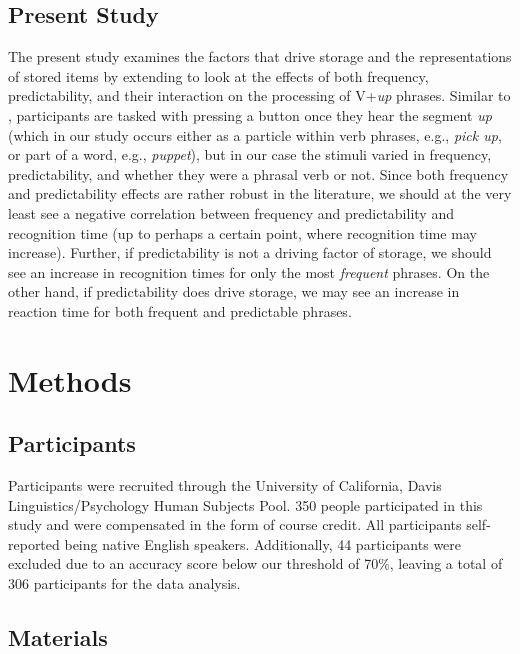\documentclass[
  authoryear,
  preprint,
  1p,
  onecolumn]{elsarticle}
\begin{document}
\subsection{Present Study}\label{present-study}

The present study examines the factors that drive storage and the
representations of stored items by extending \citet{kapatsinski2009} to
look at the effects of both frequency, predictability, and their
interaction on the processing of V+\emph{up} phrases. Similar to
\citet{kapatsinski2009}, participants are tasked with pressing a button
once they hear the segment \emph{up} (which in our study occurs either
as a particle within verb phrases, e.g., \emph{pick up}, or part of a
word, e.g., \emph{puppet}), but in our case the stimuli varied in
frequency, predictability, and whether they were a phrasal verb or not.
Since both frequency and predictability effects are rather robust in the
literature, we should at the very least see a negative correlation
between frequency and predictability and recognition time (up to perhaps
a certain point, where recognition time may increase). Further, if
predictability is not a driving factor of storage, we should see an
increase in recognition times for only the most \emph{frequent} phrases.
On the other hand, if predictability does drive storage, we may see an
increase in reaction time for both frequent and predictable phrases.

\section{Methods}\label{methods}

\subsection{Participants}\label{participants}

Participants were recruited through the University of California, Davis
Linguistics/Psychology Human Subjects Pool. 350 people participated in
this study and were compensated in the form of course credit. All
participants self-reported being native English speakers. Additionally,
44 participants were excluded due to an accuracy score below our
threshold of 70\%, leaving a total of 306 participants for the data
analysis.

\subsection{Materials}\label{materials}
\end{document}
